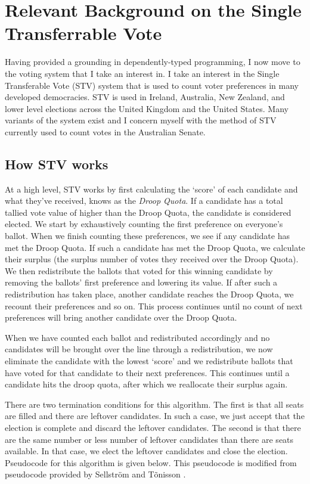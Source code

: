 \chapter{Relevant Background on the Single Transferrable Vote}

Having provided a grounding in dependently-typed programming, I now move to the
voting system that I take an interest in. I take an interest in the Single
Transferable Vote (STV) system that is used to count voter preferences in many
developed democracies. STV is used in Ireland, Australia, New Zealand, and lower
level elections across the United Kingdom and the United States. Many variants
of the system exist and I concern myself with the method of STV currently used
to count votes in the Australian Senate. 

\section{How STV works}

At a high level, STV works by first calculating the `score' of each candidate
and what they've received, knows as the \textit{Droop Quota}. If a candidate has
a total tallied vote value of higher than the Droop Quota, the candidate is
considered elected. We start by exhaustively counting the first preference on
everyone's ballot. When we finish counting these preferences, we see if any
candidate has met the Droop Quota. If such a candidate has met the Droop Quota,
we calculate their surplus (the surplus number of votes they received over the
Droop Quota). We then redistribute the ballots that voted for this winning
candidate by removing the ballots' first preference and lowering its value. If
after such a redistribution has taken place, another candidate reaches the Droop
Quota, we recount their preferences and so on. This process continues until no
count of next preferences will bring another candidate over the Droop Quota. 

When we have counted each ballot and redistributed accordingly and no candidates
will be brought over the line through a redistribution, we now eliminate the
candidate with the lowest `score' and we redistribute ballots that have voted
for that candidate to their next preferences. This continues until a candidate
hits the droop quota, after which we reallocate their surplus again. 

There are two termination conditions for this algorithm. The first is that all
seats are filled and there are leftover candidates. In such a case, we just
accept that the election is complete and discard the leftover candidates. The
second is that there are the same number or less number of leftover candidates
than there are seats available. In that case, we elect the leftover candidates
and close the election. Pseudocode for this algorithm is given below. This
pseudocode is modified from pseudocode provided by Sellstr\"om and T\~onisson
\cite{stv_pseudocode}. 


